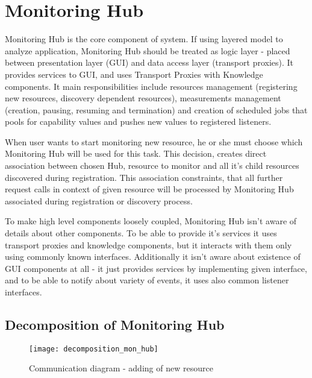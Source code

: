 %


\section{Monitoring Hub}
\label{sec:arch_monitoring_hub}


Monitoring Hub is the core component of system. If using layered model to analyze application, Monitoring Hub should be
treated as logic layer - placed between presentation layer (GUI) and data access layer (transport proxies). It
provides services to GUI, and uses Transport Proxies with Knowledge components.
It main responsibilities include resources management (registering new resources, discovery dependent resources),
measurements management (creation, pausing, resuming and termination) and creation of scheduled jobs that pools for
capability values and pushes new values to registered listeners. 

When user wants to start monitoring new resource, he or she must choose which Monitoring Hub will be used for this
task. This decision, creates direct association between chosen Hub, resource to monitor and all it's
child resources discovered during registration. This association constraints, that all further request calls in
context of given resource will be processed by Monitoring Hub associated during registration or discovery process.

To make high level components loosely coupled, Monitoring Hub isn't aware of details about other components. To be able
to provide it's services it uses transport proxies and knowledge components, but it interacts with them only using
commonly known interfaces. Additionally it isn't aware about existence of GUI components at all - it just provides
services by implementing given interface, and to be able to notify about variety of events, it uses also common listener
interfaces.

\subsection{Decomposition of Monitoring Hub}

\begin{figure}[h]
  \centering
  \texttt{[image: decomposition\_mon\_hub]}
  \caption{Communication diagram - adding of new resource}
  \label{fig:decomposition_mon_hub}
\end{figure}

